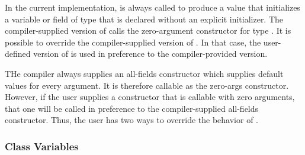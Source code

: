 In the current implementation,  is always called to
produce a value that initializes a variable or field of type  that is
declared without an explicit initializer.  The compiler-supplied version of
 calls the zero-argument constructor for type .
It is possible to override the compiler-supplied version of .
In that case, the user-defined version of  is used in
preference to the compiler-provided version.

THe compiler always supplies an all-fields constructor which supplies default
values for every argument.  It is therefore callable as the zero-args
constructor.  However, if the user supplies a constructor that is callable with
zero arguments, that one will be called in preference to the compiler-supplied
all-fields constructor.
Thus, the user has two ways to override the behavior of .

\subsubsection{Class Variables}


